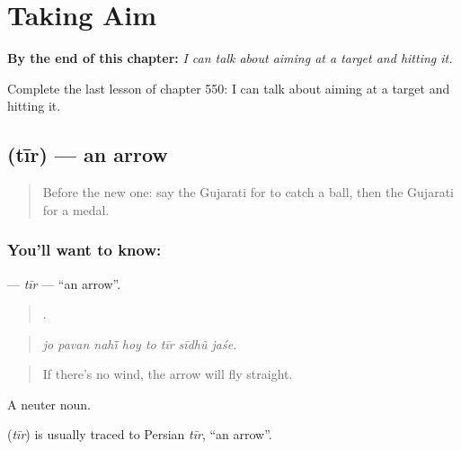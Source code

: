 
\chapter{Taking Aim}
\label{ch:gu-taking-aim}

\begin{chapteropening}
\textbf{By the end of this chapter:} \emph{I can talk about aiming at a target and hitting it.}

Complete the last lesson of chapter 550: I can talk about aiming at a target and hitting it.
\end{chapteropening}

\section[\texorpdfstring{\gu{તીર} (tīr)}{તીર (tīr)}]{ (tīr) — an arrow}

\label{lesson:GU-C550-tir}



\begin{quote}
Before the new one: say the Gujarati for to catch a ball, then the Gujarati for a medal.
\end{quote}

\subsection*{You'll want to know: }
\textbf{} — \emph{tīr} — \textquotedblleft{}an arrow\textquotedblright{}.

\begin{quote}
       .
\end{quote}

\begin{quote}
\emph{jo pavan nahī̃ hoy to tīr sīdhũ jaśe.}
\end{quote}

\begin{quote}
If there's no wind, the arrow will fly straight.
\end{quote}

A neuter noun.

\begin{cousinweb}
\textbf{} (\emph{tīr}) is usually traced to Persian \emph{tīr}, \textquotedblleft{}an arrow\textquotedblright{}.
\end{cousinweb}

